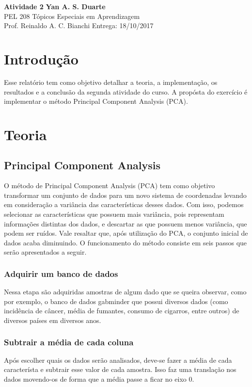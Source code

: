 \documentclass[a4paper, 11pt]{article}
\begin{document}
\noindent
\large\textbf{Atividade 2} \hfill \textbf{Yan A. S. Duarte} \\
\normalsize PEL 208 \hfill Tópicos Especiais em Aprendizagem \\
Prof. Reinaldo A. C. Bianchi \hfill Entrega: 18/10/2017 \\


\section*{Introdução}

Esse relatório tem como objetivo detalhar a teoria, a implementação, os resultados e a conclusão da segunda atividade do curso. A propósta do exercício é implementar o método Principal Component Analysis (PCA).

\section*{Teoria}
\subsection*{Principal Component Analysis}
O método de Principal Component Analysis (PCA) tem como objetivo transformar um conjunto de dados para um novo sistema de coordenadas levando em consideração a variância das características desses dados.
Com isso, podemos selecionar as características que possuem mais variância, pois representam informações distintas dos dados, e descartar as que possuem menos variância, que podem ser ruídos.
Vale resaltar que, após utilização do PCA, o conjunto inicial de dados acaba diminuindo.
O funcionamento do método consiste em seis passos que serão apresentados a seguir.

\subsubsection*{Adquirir um banco de dados}
Nessa etapa são adquiridas amostras de algum dado que se queira observar, como por exemplo, o banco de dados gabminder que possui diversos dados (como incidência de câncer, média de fumantes, consumo de cigarros, entre outros) de diversos países em diversos anos.

\subsubsection*{Subtrair a média de cada coluna}
Após escolher quais os dados serão analisados, deve-se fazer a média de cada característa e subtrair esse valor de cada amostra.
Isso faz uma translação nos dados movendo-os de forma que a média passe a ficar no eixo 0.
\end{document}
